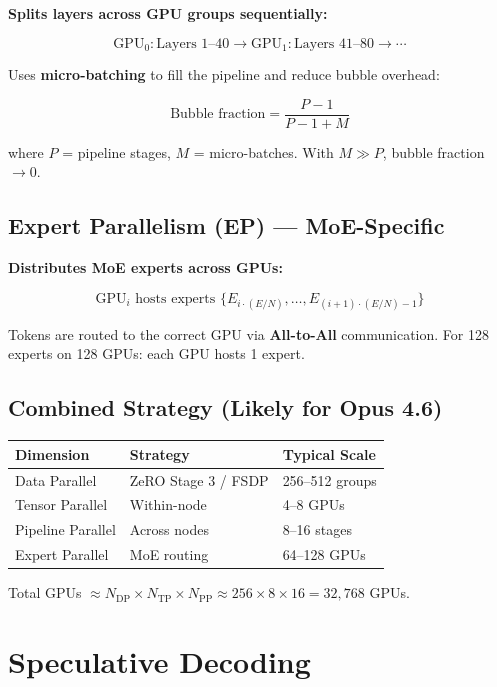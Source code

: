 \documentclass[11pt,a4paper]{article}
\begin{document}
\textbf{Splits layers across GPU groups sequentially:}

$$\text{GPU}_0: \text{Layers 1--40} \to \text{GPU}_1: \text{Layers 41--80} \to \cdots$$

Uses \textbf{micro-batching} to fill the pipeline and reduce bubble overhead:

$$\text{Bubble fraction} = \frac{P - 1}{P - 1 + M}$$

where $P$ = pipeline stages, $M$ = micro-batches. With $M \gg P$, bubble fraction $\to 0$.

\subsection{Expert Parallelism (EP) --- MoE-Specific}

\textbf{Distributes MoE experts across GPUs:}

$$\text{GPU}_i \text{ hosts experts } \{E_{i \cdot (E/N)}, \ldots, E_{(i+1) \cdot (E/N) - 1}\}$$

Tokens are routed to the correct GPU via \textbf{All-to-All} communication. For 128 experts on 128 GPUs: each GPU hosts 1 expert.

\subsection{Combined Strategy (Likely for Opus 4.6)}

\begin{center}
\begin{tabular}{lll}
\toprule
\textbf{Dimension} & \textbf{Strategy} & \textbf{Typical Scale} \\
\midrule
Data Parallel & ZeRO Stage 3 / FSDP & 256--512 groups \\
Tensor Parallel & Within-node & 4--8 GPUs \\
Pipeline Parallel & Across nodes & 8--16 stages \\
Expert Parallel & MoE routing & 64--128 GPUs \\
\bottomrule
\end{tabular}
\end{center}

Total GPUs $\approx N_{\text{DP}} \times N_{\text{TP}} \times N_{\text{PP}} \approx 256 \times 8 \times 16 = 32{,}768$ GPUs.

\section{Speculative Decoding}
\end{document}
